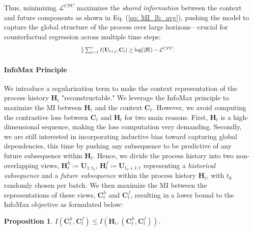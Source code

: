 \documentclass{article}
\theoremstyle{plain}
\newtheorem{proposition}[theorem]{Proposition}
\theoremstyle{definition}
\theoremstyle{remark}
\begin{document}
Thus, minimizing $\mathcal{L}^{CPC}$ maximizes the \emph{shared information} between the context and future components as shown in Eq. (\ref{eq: MI_lb_avg}), pushing the model to capture the global structure of the process over large horizons—crucial for counterfactual regression across multiple time steps:
\begin{equation}
\label{eq: MI_lb_avg}
\resizebox{0.4\textwidth}{!}{$
\frac{1}{\tau} \sum_{j=1}^{\tau} I(\mathbf{U}_{t+j}, \mathbf{C}_{t}) \geq \log(|\mathcal{B}|) - \mathcal{L}^{CPC}.
$}
\end{equation}

\paragraph{InfoMax Principle} We introduce a regularization term to make the context representation of the process history $\mathbf{H}_{t}$ "reconstructable." We leverage the InfoMax principle to maximize the MI between $\mathbf{H}_{t}$ and the context $\mathbf{C}_t$. However, we avoid computing the contrastive loss between $\mathbf{C}_t$ and $\mathbf{H}_t$ for two main reasons. First, $\mathbf{H}_{t}$ is a high-dimensional sequence, making the loss computation very demanding. Secondly, we are still interested in incorporating inductive bias toward capturing global dependencies, this time by pushing any subsequence to be predictive of any future subsequence within $\mathbf{H}_t$. Hence, we divide the process history into two non-overlapping views, $\mathbf{H}_t^h\coloneqq\mathbf{U}_{1:t_0}$, $\mathbf{H}_t^f\coloneqq\mathbf{U}_{t_0+1:t}$ representing a \emph{historical subsequence} and a \emph{future subsequence} within the process history $\mathbf{H}_{t}$, with $t_0$ randomly chosen per batch. We then maximize the MI between the representations of these views, $\mathbf{C}_t^h$ and $\mathbf{C}_t^f$, resulting in a lower bound to the InfoMax objective as formulated below:
\begin{proposition}    
    $ I(\mathbf{C}_t^h,\mathbf{C}_t^f)\leq I(\mathbf{H}_{t}, (\mathbf{C}_t^h, \mathbf{C}_t^f))$.
    \label{prop: lb_infomax}
\end{proposition}
\end{document}
